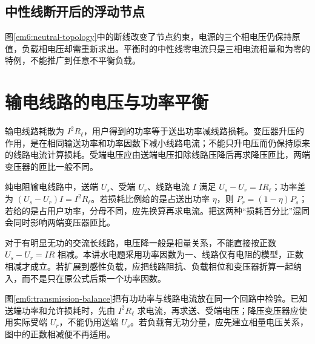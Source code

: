 \subsection{中性线断开后的浮动节点}



图\ref{em6:neutral-topology}中的断线改变了节点约束，电源的三个相电压仍保持原值，负载相电压却需重新求出。平衡时的中性线零电流只是三相电流相量和为零的特例，不能推广到任意不平衡负载。


\section{输电线路的电压与功率平衡}

输电线路耗散为 $I^2R_\ell$，用户得到的功率等于送出功率减线路损耗。变压器升压的作用，是在相同输送功率和功率因数下减小线路电流；不能只升电压而仍保持原来的线路电流计算损耗。受端电压应由送端电压扣除线路压降后再求降压匝比，两端变压器的匝比一般不同。



纯电阻输电线路中，送端 $U_s$、受端 $U_r$、线路电流 $I$ 满足 $U_s-U_r=IR_\ell$；功率差为 $(U_s-U_r)I=I^2R_\ell$。若损耗比例给的是占送出功率 $\eta$，则 $P_r=(1-\eta)P_s$；若给的是占用户功率，分母不同，应先换算再求电流。把这两种“损耗百分比”混同会同时影响两端变压器匝比。

对于有明显无功的交流长线路，电压降一般是相量关系，不能直接按正数 $U_s-U_r=IR$ 相减。本讲水电题采用功率因数为一、线路仅有电阻的模型，正数相减才成立。若扩展到感性负载，应把线路阻抗、负载相位和变压器折算一起纳入，而不是只在原公式后乘一个功率因数。


图\ref{em6:transmission-balance}把有功功率与线路电流放在同一个回路中检验。已知送端功率和允许损耗时，先由 $I^2R_\ell$ 求电流，再求送、受端电压；降压变压器应使用实际受端 $U_r$，不能仍用送端 $U_s$。若负载有无功分量，应先建立相量电压关系，图中的正数相减便不再适用。


